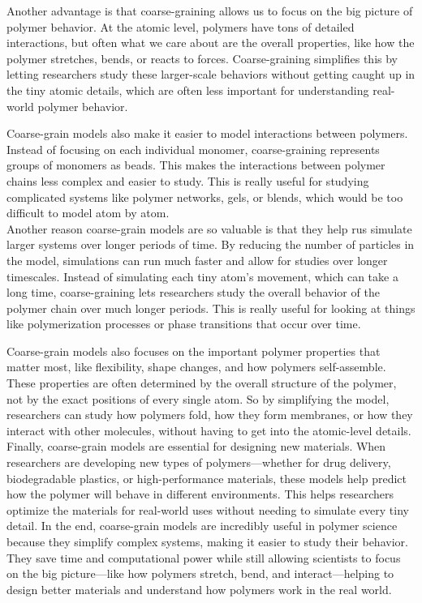 \documentclass[12pt]{article}
\begin{document}
\begin{flushleft}
	Another advantage is that coarse-graining allows us to focus on the big picture of polymer behavior. At the atomic level, polymers have tons of detailed interactions, but often what we care about are the overall properties, like how the polymer stretches, bends, or reacts to forces. Coarse-graining simplifies this by letting researchers study these larger-scale behaviors without getting caught up in the tiny atomic details, which are often less important for understanding real-world polymer behavior.
	
	Coarse-grain models also make it easier to model interactions between polymers. Instead of focusing on each individual monomer, coarse-graining represents groups of monomers as beads. This makes the interactions between polymer chains less complex and easier to study. This is really useful for studying complicated systems like polymer networks, gels, or blends, which would be too difficult to model atom by atom.\\
	
	
	Another reason coarse-grain models are so valuable is that they help rus simulate larger systems over longer periods of time. By reducing the number of particles in the model, simulations can run much faster and allow for studies over longer timescales. Instead of simulating each tiny atom’s movement, which can take a long time, coarse-graining lets researchers study the overall behavior of the polymer chain over much longer periods. This is really useful for looking at things like polymerization processes or phase transitions that occur over time.
	
	Coarse-grain models also focuses on the important polymer properties that matter most, like flexibility, shape changes, and how polymers self-assemble. These properties are often determined by the overall structure of the polymer, not by the exact positions of every single atom. So by simplifying the model, researchers can study how polymers fold, how they form membranes, or how they interact with other molecules, without having to get into the atomic-level details.\\
	
	Finally, coarse-grain models are essential for designing new materials. When researchers are developing new types of polymers—whether for drug delivery, biodegradable plastics, or high-performance materials, these models help predict how the polymer will behave in different environments. This helps researchers optimize the materials for real-world uses without needing to simulate every tiny detail.
	In the end, coarse-grain models are incredibly useful in polymer science because they simplify complex systems, making it easier to study their behavior. They save time and computational power while still allowing scientists to focus on the big picture—like how polymers stretch, bend, and interact—helping to design better materials and understand how polymers work in the real world.
	

\end{flushleft}
\end{document}
